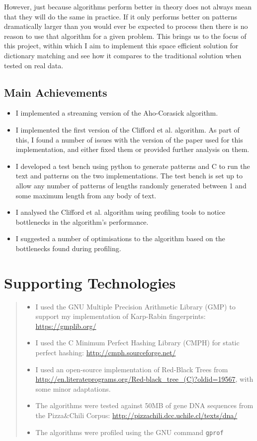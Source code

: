 \documentclass[ %
                    author={Dominic Joseph Moylett},
                    degree={MEng},
                     title={Dictionary Matching with Fingerprints},
                  subtitle={An Empirical Analysis},
                      type={research},
                      year={2015} ]{dissertation}
\begin{document}
However, just because algorithms perform better in theory does not always mean that they will do the same in practice. If it only performs better on patterns dramatically larger than you would ever be expected to process then there is no reason to use that algorithm for a given problem. This brings us to the focus of this project, within which I aim to implement this space efficient solution for dictionary matching and see how it compares to the traditional solution when tested on real data.

\section*{Main Achievements}

\begin{itemize}
  \item I implemented a streaming version of the Aho-Corasick \cite{Aho:1975:ESM:360825.360855} algorithm.
  \item I implemented the first version of the Clifford et al. \cite{2015arXiv150406242C} algorithm. As part of this, I found a number of issues with the version of the paper used for this implementation, and either fixed them or provided further analysis on them.
  \item I developed a test bench using python to generate patterns and C to run the text and patterns on the two implementations. The test bench is set up to allow any number of patterns of lengths randomly generated between 1 and some maximum length from any body of text.
  \item I analysed the Clifford et al. algorithm using profiling tools to notice bottlenecks in the algorithm's performance.
  \item I suggested a number of optimisations to the algorithm based on the bottlenecks found during profiling.
\end{itemize}

\chapter*{Supporting Technologies}
\label{ch:supporting-tech}

\begin{quote}
\begin{itemize}
\item I used the GNU Multiple Precision Arithmetic Library (GMP) to support my implementation of Karp-Rabin fingerprints: \url{https://gmplib.org/}
\item I used the C Minimum Perfect Hashing Library (CMPH) for static perfect hashing: \url{http://cmph.sourceforge.net/}
\item I used an open-source implementation of Red-Black Trees from \url{http://en.literateprograms.org/Red-black_tree_(C)?oldid=19567}, with some minor adaptations.
\item The algorithms were tested against 50MB of gene DNA sequences from the Pizza\&Chili Corpus: \url{http://pizzachili.dcc.uchile.cl/texts/dna/}
\item The algorithms were profiled using the GNU command \texttt{gprof}
\end{itemize}
\end{quote}
\end{document}
